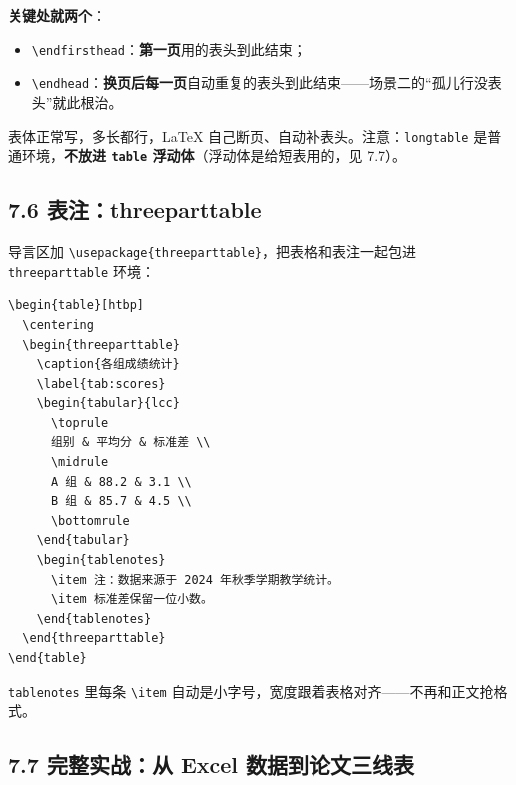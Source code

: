 \textbf{关键处就两个}：

\begin{itemize}
\setlength{\itemsep}{2pt}
\item \texttt{\textbackslash{}endfirsthead}：\textbf{第一页}用的表头到此结束；
\item \texttt{\textbackslash{}endhead}：\textbf{换页后每一页}自动重复的表头到此结束——场景二的“孤儿行没表头”就此根治。
\end{itemize}

表体正常写，多长都行，LaTeX 自己断页、自动补表头。注意：\texttt{longtable} 是普通环境，\textbf{不放进 \texttt{table} 浮动体}（浮动体是给短表用的，见 7.7）。

\subsection*{7.6 表注：threeparttable}

导言区加 \texttt{\textbackslash{}usepackage\{threeparttable\}}，把表格和表注一起包进 \texttt{threeparttable} 环境：

\begin{lstlisting}
\begin{table}[htbp]
  \centering
  \begin{threeparttable}
    \caption{各组成绩统计}
    \label{tab:scores}
    \begin{tabular}{lcc}
      \toprule
      组别 & 平均分 & 标准差 \\
      \midrule
      A 组 & 88.2 & 3.1 \\
      B 组 & 85.7 & 4.5 \\
      \bottomrule
    \end{tabular}
    \begin{tablenotes}
      \item 注：数据来源于 2024 年秋季学期教学统计。
      \item 标准差保留一位小数。
    \end{tablenotes}
  \end{threeparttable}
\end{table}
\end{lstlisting}

\texttt{tablenotes} 里每条 \texttt{\textbackslash{}item} 自动是小字号，宽度跟着表格对齐——不再和正文抢格式。

\subsection*{7.7 完整实战：从 Excel 数据到论文三线表}

